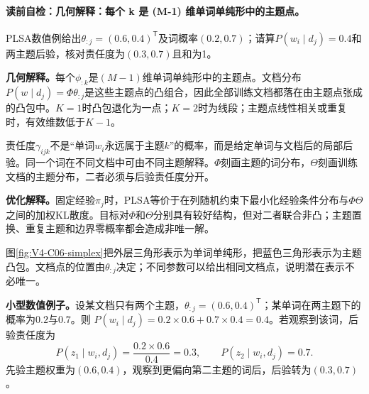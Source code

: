 \label{struct:V4-C06-CH14}
\paragraph{读前自检：几何解释：每个 k 是 (M-1) 维单词单纯形中的主题点。}PLSA数值例给出$\theta_{:j}=(0.6,0.4)^{\mathsf T}$及词概率$(0.2,0.7)$；请算$P(w_i\mid d_j)=0.4$和两主题后验，核对责任度为$(0.3,0.7)$且和为1。\par

\begin{geometrybox}
\textbf{几何解释。}每个$\phi_{:k}$是$(M-1)$维单词单纯形中的主题点。文档分布$P(w\mid d_j)=\Phi\theta_{:j}$是这些主题点的凸组合，因此全部训练文档都落在由主题点张成的凸包中。$K=1$时凸包退化为一点；$K=2$时为线段；主题点线性相关或重复时，有效维数低于$K-1$。
\end{geometrybox}

\label{struct:V4-C06-CH15}
\begin{probabilitybox}
责任度$\gamma_{ijk}$不是“单词$w_i$永远属于主题$k$”的概率，而是给定单词与文档后的局部后验。同一个词在不同文档中可由不同主题解释。$\Phi$刻画主题的词分布，$\Theta$刻画训练文档的主题分布，二者必须与后验责任度分开。
\end{probabilitybox}

\label{struct:V4-C06-CH16}
\begin{optimizationbox}
\textbf{优化解释。}固定经验$\pi_j$时，PLSA等价于在列随机约束下最小化经验条件分布与$\Phi\Theta$之间的加权KL散度。目标对$\Phi$和$\Theta$分别具有较好结构，但对二者联合非凸；主题置换、重复主题和边界零概率都会造成非唯一解。
\end{optimizationbox}

\label{struct:V4-C06-CH17}

图\ref{fig:V4-C06-simplex}把外层三角形表示为单词单纯形，把蓝色三角形表示为主题凸包。文档点的位置由$\theta_{:j}$决定；不同参数可以给出相同文档点，说明潜在表示不必唯一。

\label{struct:V4-C06-CH18}
\textbf{小型数值例子。}设某文档只有两个主题，$\theta_{:j}=(0.6,0.4)^{\mathsf T}$；某单词在两主题下的概率为$0.2$与$0.7$。则
$P(w_i\mid d_j)=0.2\times0.6+0.7\times0.4=0.4$。若观察到该词，后验责任度为
\[
P(z_1\mid w_i,d_j)=\frac{0.2\times0.6}{0.4}=0.3,
\qquad
P(z_2\mid w_i,d_j)=0.7.
\]
先验主题权重为$(0.6,0.4)$，观察到更偏向第二主题的词后，后验转为$(0.3,0.7)$。

